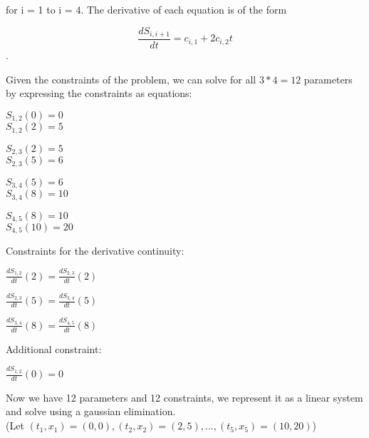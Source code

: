 \documentclass[11pt,letterpaper]{article}
\begin{document}
for i = 1 to i = 4. The derivative of each equation is of the form

$$\frac{dS_{i,i+1}}{dt} = c_{i,1} + 2c_{i,2} t$$.

Given the constraints of the problem, we can solve for all $3 * 4 = 12$ parameters by expressing the constraints as equations:

$S_{1,2}(0) = 0$\\
$S_{1,2}(2) = 5$

$S_{2,3}(2) = 5$\\
$S_{2,3}(5) = 6$

$S_{3,4}(5) = 6$\\
$S_{3,4}(8) = 10$

$S_{4,5}(8) = 10$\\
$S_{4,5}(10) = 20$

Constraints for the derivative continuity:

$\frac{dS_{1,2}}{dt}(2) = \frac{dS_{2,3}}{dt}(2)$

$\frac{dS_{2,3}}{dt}(5) = \frac{dS_{3,4}}{dt}(5)$

$\frac{dS_{3,4}}{dt}(8) = \frac{dS_{4,5}}{dt}(8)$

Additional constraint:

$\frac{dS_{1,2}}{dt}(0) = 0$


Now we have 12 parameters and 12 constraints, we represent it as a linear system and solve using a gaussian elimination.\\
(Let $(t_1, x_1) = (0,0), (t_2, x_2) = (2,5), ... , (t_5,x_5) = (10,20) $)
\end{document}
